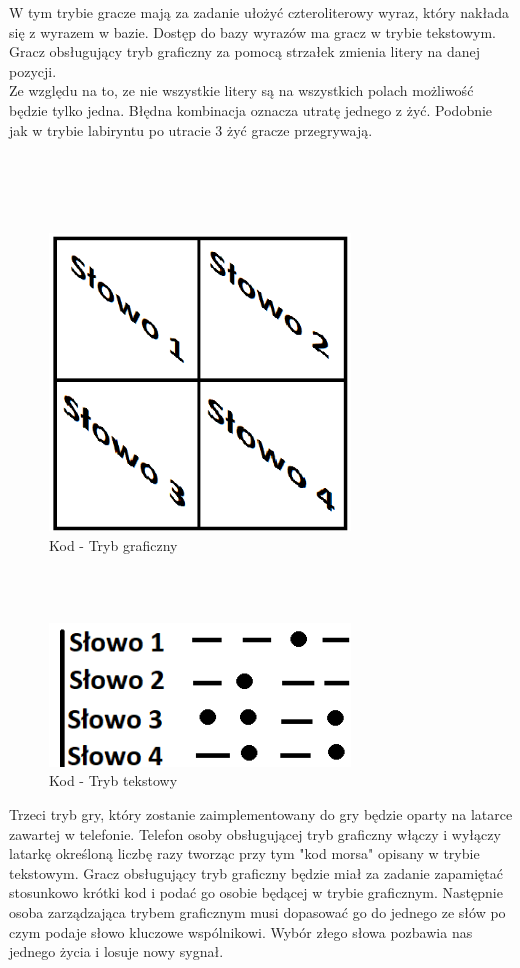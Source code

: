 W tym trybie gracze mają za zadanie ułożyć czteroliterowy wyraz, który nakłada się z wyrazem w bazie. Dostęp do bazy wyrazów ma gracz w trybie tekstowym. Gracz obsługujący tryb graficzny za pomocą strzałek zmienia litery na danej pozycji. 
\\Ze względu na to, ze nie wszystkie litery są na wszystkich polach możliwość będzie tylko jedna. Błędna kombinacja oznacza utratę jednego z żyć. Podobnie jak w trybie labiryntu po utracie 3 żyć gracze przegrywają.
\\
\\
\\
\\
\\
	\begin{figure}[!htb]
	\begin{center}
		\includegraphics[width=8cm]{rys/gra5.png}
		\caption{Kod - Tryb graficzny}
		\label{rys:rysunek001}
	\end{center}
\end{figure}
\\
\\
	\begin{figure}[!htb]
	\begin{center}
		\includegraphics[width=8cm]{rys/gra6.png}
		\caption{Kod - Tryb tekstowy}
		\label{rys:rysunek001}
	\end{center}
\end{figure}
Trzeci tryb gry, który zostanie zaimplementowany do gry będzie oparty na latarce zawartej w telefonie. Telefon osoby obsługującej tryb graficzny włączy i wyłączy latarkę określoną liczbę razy tworząc przy tym "kod morsa" opisany w trybie tekstowym. Gracz obsługujący tryb graficzny będzie miał za zadanie zapamiętać stosunkowo krótki kod i podać go osobie będącej w trybie graficznym. Następnie osoba zarządzająca trybem graficznym musi dopasować go do jednego ze słów po czym podaje słowo kluczowe wspólnikowi. Wybór złego słowa pozbawia nas jednego życia i losuje nowy sygnał.
\\


